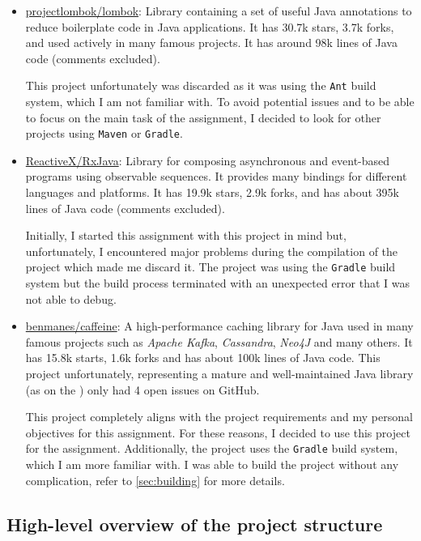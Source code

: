 \begin{itemize}
	\item \href{https://github.com/projectlombok/lombok}{projectlombok/lombok}: Library containing a set of useful Java annotations to reduce boilerplate code in Java applications. It has 30.7k stars, 3.7k forks, and used actively in many famous projects. It has around 98k lines of Java code (comments excluded).

	      This project unfortunately was discarded as it was using the \texttt{Ant} build system, which I am not familiar with. To avoid potential issues and to be able to focus on the main task of the assignment, I decided to look for other projects using \texttt{Maven} or \texttt{Gradle}.

	\item \href{https://github.com/ReactiveX/RxJava}{ReactiveX/RxJava}: Library for composing asynchronous and event-based programs using observable sequences. It provides many bindings for different languages and platforms. It has 19.9k stars, 2.9k forks, and has about 395k lines of Java code (comments excluded).

	      Initially, I started this assignment with this project in mind but, unfortunately, I encountered major problems during the compilation of the project which made me discard it. The project was using the \texttt{Gradle} build system but the build process terminated with an unexpected error that I was not able to debug.

	\item \href{https://github.com/ben-manes/caffeine}{benmanes/caffeine}: A high-performance caching library for Java used in many famous projects such as \textit{Apache Kafka}, \textit{Cassandra}, \textit{Neo4J} and many others. It has 15.8k starts, 1.6k forks and has about 100k lines of Java code. This project unfortunately, representing a mature and well-maintained Java library (as on the ) only had 4 open issues on GitHub.

	      This project completely aligns with the project requirements and my personal objectives for this assignment. For these reasons, I decided to use this project for the assignment. Additionally, the project uses the \texttt{Gradle} build system, which I am more familiar with. I was able to build the project without any complication, refer to \autoref{sec:building} for more details.

\end{itemize}

\subsection{High-level overview of the project structure}

